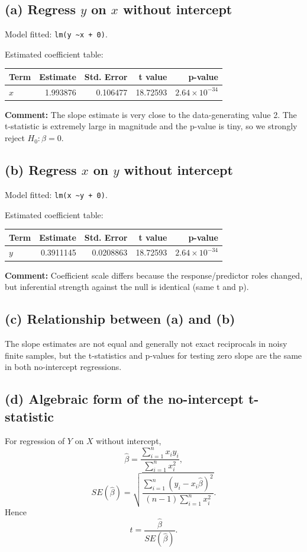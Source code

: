 \documentclass[12pt]{article}
\begin{document}
\subsection*{(a) Regress $y$ on $x$ without intercept}
Model fitted: \texttt{lm(y \textasciitilde x + 0)}.

Estimated coefficient table:
\begin{center}
\begin{tabular}{lrrrr}
\toprule
Term & Estimate & Std. Error & t value & p-value \\
\midrule
$x$ & 1.993876 & 0.106477 & 18.72593 & $2.64\times 10^{-34}$ \\
\bottomrule
\end{tabular}
\end{center}

\textbf{Comment:} The slope estimate is very close to the data-generating value 2. The t-statistic is extremely large in magnitude and the p-value is tiny, so we strongly reject $H_0:\beta=0$.

\subsection*{(b) Regress $x$ on $y$ without intercept}
Model fitted: \texttt{lm(x \textasciitilde y + 0)}.

Estimated coefficient table:
\begin{center}
\begin{tabular}{lrrrr}
\toprule
Term & Estimate & Std. Error & t value & p-value \\
\midrule
$y$ & 0.3911145 & 0.0208863 & 18.72593 & $2.64\times 10^{-34}$ \\
\bottomrule
\end{tabular}
\end{center}

\textbf{Comment:} Coefficient scale differs because the response/predictor roles changed, but inferential strength against the null is identical (same t and p).

\subsection*{(c) Relationship between (a) and (b)}
The slope estimates are not equal and generally not exact reciprocals in noisy finite samples, but the t-statistics and p-values for testing zero slope are the same in both no-intercept regressions.

\subsection*{(d) Algebraic form of the no-intercept t-statistic}
For regression of $Y$ on $X$ without intercept,
\[
\hat\beta = \frac{\sum_{i=1}^n x_i y_i}{\sum_{i=1}^n x_i^2},
\]
\[
SE(\hat\beta) = \sqrt{\frac{\sum_{i=1}^n (y_i - x_i\hat\beta)^2}{(n-1)\sum_{i=1}^n x_i^2}}.
\]
Hence
\[
t = \frac{\hat\beta}{SE(\hat\beta)}.
\]
\end{document}
